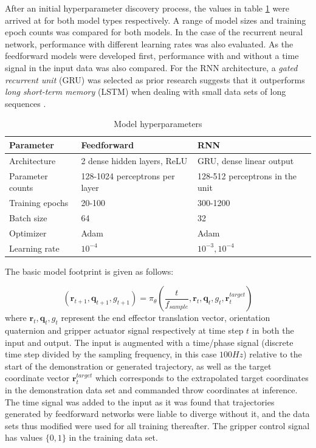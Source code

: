 \documentclass{article}
\begin{document}
After an initial hyperparameter discovery process, the values in table \ref{tab:table1} were arrived at for both model types respectively. A range of model sizes and training epoch counts was compared for both models. In the case of the recurrent neural network, performance with different learning rates was also evaluated. As the feedforward models were developed first, performance with and without a time signal in the input data was also compared. For the RNN architecture, a \emph{gated recurrent unit} (GRU) was selected as prior research suggests that it outperforms \emph{long short-term memory} (LSTM) when dealing with small data sets of long sequences \citep{yang2020lstm}.

\begin{table}
	\caption{Model hyperparameters}
	\centering
	\begin{tabular}{lll}
		\toprule
		Parameter & Feedforward & RNN \\
		\midrule
		Architecture & 2 dense hidden layers, ReLU  & GRU, dense linear output   \\
		Parameter counts     & 128-1024 perceptrons per layer & 128-512 perceptrons in the unit \\
		Training epochs     & 20-100       & 300-1200  \\
		Batch size    & 64       & 32  \\
		Optimizer    & Adam	& Adam  \\
		Learning rate    & $10^{-4}$       & $10^{-3}, 10^{-4}$   \\
		\bottomrule
	\end{tabular}
	\label{tab:table1}
\end{table}

The basic model footprint is given as follows:

\begin{equation}
	(\mathbf{r}_{t+1}, \mathbf{q}_{t+1}, g_{t+1}) = \pi_{\theta}\left(\frac{t}{f_{sample}}, \mathbf{r}_{t}, \mathbf{q}_{t}, g_{t}, \mathbf{r}^{target}_t \right)
\end{equation}
where $\mathbf{r}_{t}, \mathbf{q}_{t}, g_{t}$ represent the end effector translation vector, orientation quaternion and gripper actuator signal respectively at time step $t$ in both the input and output. The input is augmented with a time/phase signal (discrete time step divided by the sampling frequency, in this case $100Hz$) relative to the start of the demonstration or generated trajectory, as well as the target coordinate vector $\mathbf{r}^{target}_t$ which corresponds to the extrapolated target coordinates in the demonstration data set and commanded throw coordinates at inference. The time signal was added to the input as it was found that trajectories generated by feedforward networks were liable to diverge without it, and the data sets thus modified were used for all training thereafter. The gripper control signal has values $\lbrace 0,1 \rbrace$ in the training data set.
\end{document}
